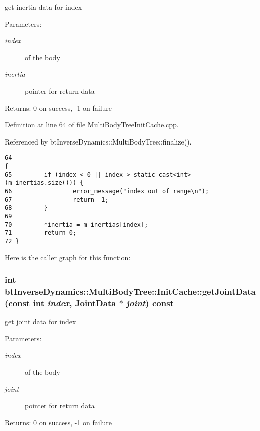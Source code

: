 get inertia data for index \begin{Desc}
\item[Parameters:]
\begin{description}
\item[{\em index}]of the body \item[{\em inertia}]pointer for return data \end{description}
\end{Desc}
\begin{Desc}
\item[Returns:]0 on success, -1 on failure \end{Desc}


Definition at line 64 of file MultiBodyTreeInitCache.cpp.

Referenced by btInverseDynamics::MultiBodyTree::finalize().

\begin{Code}\begin{verbatim}64                                                                                       {
65         if (index < 0 || index > static_cast<int>(m_inertias.size())) {
66                 error_message("index out of range\n");
67                 return -1;
68         }
69 
70         *inertia = m_inertias[index];
71         return 0;
72 }
\end{verbatim}
\end{Code}




Here is the caller graph for this function:\hypertarget{classbt_inverse_dynamics_1_1_multi_body_tree_1_1_init_cache_b877d886f33dd223c33d6629d7531b2d}{
\subsubsection[getJointData]{\setlength{\rightskip}{0pt plus 5cm}int btInverseDynamics::MultiBodyTree::InitCache::getJointData (const int {\em index}, \/  {\bf JointData} $\ast$ {\em joint}) const}}
\label{classbt_inverse_dynamics_1_1_multi_body_tree_1_1_init_cache_b877d886f33dd223c33d6629d7531b2d}


get joint data for index \begin{Desc}
\item[Parameters:]
\begin{description}
\item[{\em index}]of the body \item[{\em joint}]pointer for return data \end{description}
\end{Desc}
\begin{Desc}
\item[Returns:]0 on success, -1 on failure \end{Desc}


